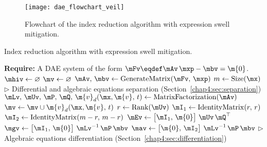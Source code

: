 \begin{figure}[htb]
  \centering
  \texttt{[image: dae\_flowchart\_veil]}
  \caption{Flowchart of the index reduction algorithm with expression swell mitigation.}
  \label{chap4:fig:index_reduction_veil}
\end{figure}

\begin{breakablealgorithm}
  \caption{Index reduction algorithm with expression swell mitigation.}
  \label{chap4:alg:index_reduction_veil}
  \begin{algorithmic}[1]
    \State \textbf{Require:} A \ac{DAE} system of the form $\mFv \eqdef \mAv \, \mxp - \mbv = \m{0}$.
     
      \State $\mhiv \gets \varnothing$ 
      \State $\mv \gets \varnothing$ 
      \State $\mAv, \, \mbv \gets \mathrm{GenerateMatrix}(\mFv, \, \mxp)$ 
      \State $m \gets \mathrm{Size}(\mx)$
        \State $\displaystyle\triangleright$ Differential and algebraic equations separation (Section~\ref{chap4:sec:separation})
        \State $\mLv, \, \mUv, \, \mP, \, \mQ, \, \m{v}_d(\mx, \m{v}, \, t) \gets \mathrm{MatrixFactorization}(\mAv)$ 
        \State $\mv \gets \mv \cup \m{v}_d(\mx, \m{v}, \, t)$ 
        \State $r \gets \mathrm{Rank}(\mUv)$ 
        \State $\mI_1 \gets \mathrm{IdentityMatrix}(r, \, r)$ 
        \State $\mI_2 \gets \mathrm{IdentityMatrix}(m-r, \, m-r)$ 
        \State $\mEv \gets \begin{bmatrix} \mI_1, \, \m{0} \end{bmatrix} \, \mUv \, \mQ^\top$ 
        \State $\mgv \gets \begin{bmatrix} \mI_1, \, \m{0} \end{bmatrix} \, \mLv^{-1} \, \mP \, \mbv$ 
        \State $\mav \gets \begin{bmatrix} \m{0}, \, \mI_2 \end{bmatrix} \, \mLv^{-1} \, \mP \, \mbv$ 
        \State $\displaystyle\triangleright$ Algebraic equations differentiation (Section~\ref{chap4:sec:differentiation})

\end{algorithmic}
\end{breakablealgorithm}
